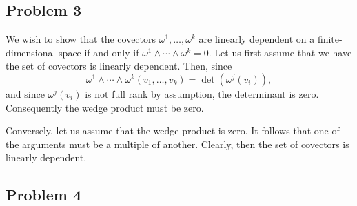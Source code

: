 \documentclass{../../mathnotes}
\begin{document}
\subsection*{Problem 3}

We wish to show that the covectors $\omega^1,\ldots,\omega^k$ are linearly dependent on a finite-dimensional space
if and only if $\omega^1\wedge\cdots\wedge\omega^k=0$. Let us first assume that we have the set of covectors is linearly
dependent. Then, since
\[\omega^1\wedge\cdots\wedge\omega^k(v_1,\ldots,v_k)=\det(\omega^j(v_i)),\]
and since $\omega^j(v_i)$ is not full rank by assumption, the determinant is zero. Consequently the wedge product must
be zero.

Conversely, let us assume that the wedge product is zero. It follows that one of the arguments must be a multiple of another.
Clearly, then the set of covectors is linearly dependent.

\subsection*{Problem 4}
\end{document}
